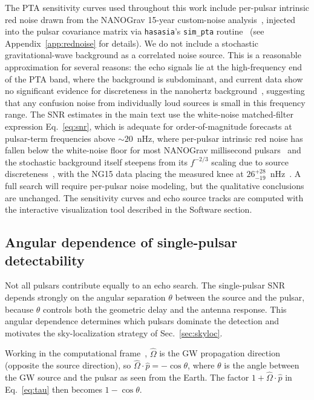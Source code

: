 \documentclass[aps,prx,twocolumn,superscriptaddress,nofootinbib,longbibliography]{revtex4-2}
\newcommand{\phat}{\hat{p}}
\newcommand{\Ohat}{\hat{\Omega}}
\begin{document}
The PTA sensitivity curves used throughout this work include per-pulsar intrinsic red noise drawn from the NANOGrav 15-year custom-noise analysis~\cite{NG15noise}, injected into the pulsar covariance matrix via \texttt{hasasia}'s \texttt{sim\_pta} routine~\cite{Hazboun2019hasasia} (see Appendix~\ref{app:rednoise} for details). We do not include a stochastic gravitational-wave background as a correlated noise source. This is a reasonable approximation for several reasons: the echo signals lie at the high-frequency end of the PTA band, where the background is subdominant, and current data show no significant evidence for discreteness in the nanohertz background~\cite{NG15discreteness}, suggesting that any confusion noise from individually loud sources is small in this frequency range. The SNR estimates in the main text use the white-noise matched-filter expression Eq.~\eqref{eq:snr}, which is adequate for order-of-magnitude forecasts at pulsar-term frequencies above $\sim20$~nHz, where per-pulsar intrinsic red noise has fallen below the white-noise floor for most NANOGrav millisecond pulsars~\cite{NG15noise} and the stochastic background itself steepens from its $f^{-2/3}$ scaling due to source discreteness~\cite{Sesana2008}, with the NG15 data placing the measured knee at $26^{+28}_{-19}$~nHz~\cite{NG15discreteness}. A full search will require per-pulsar noise modeling, but the qualitative conclusions are unchanged. The sensitivity curves and echo source tracks are computed with the interactive visualization tool described in the Software section.



\subsection{Angular dependence of single-pulsar detectability}\label{sec:snr_angle}

Not all pulsars contribute equally to an echo search. The single-pulsar SNR depends strongly on the angular separation $\theta$ between the source and the pulsar, because $\theta$ controls both the geometric delay and the antenna response. This angular dependence determines which pulsars dominate the detection and motivates the sky-localization strategy of Sec.~\ref{sec:skyloc}.

Working in the computational frame~\cite{Mingarelli2013}, $\Ohat$ is the GW propagation direction (opposite the source direction), so $\Ohat\cdot\phat = -\cos\theta$, where $\theta$ is the angle between the GW source and the pulsar as seen from the Earth. The factor $1 + \Ohat\cdot\phat$ in Eq.~\eqref{eq:tau} then becomes $1 - \cos\theta$.
\end{document}
